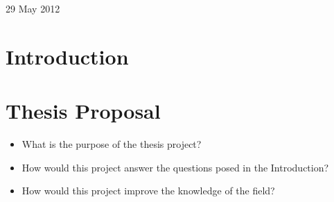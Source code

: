 \documentclass[useAMS,usenatbib,onecolumn]{mnras}
\begin{document}
\begin{center}
29 May 2012
\end{center}
\newpage

\date{Date of the review}

\section{Introduction}
\label{sec:introduction}



\section{Thesis Proposal}
\label{sec:thesis}

\begin{itemize}
	\item{What is the purpose of the thesis project?}
	\item{How would this project answer the questions posed in the Introduction?}
	\item{How would this project improve the knowledge of the field?}
\end{itemize}

\end{document}
